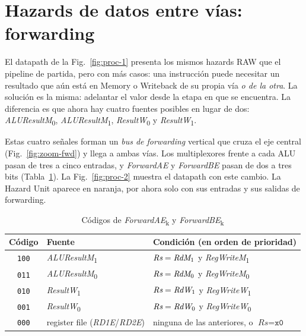 \documentclass[11pt,a4paper]{article}
\newcommand{\sig}[1]{\textit{#1}}
\newcommand{\sigk}[2]{\textit{#1}\textsubscript{#2}}
\begin{document}
\section{Hazards de datos entre vías: forwarding}
\label{sec:forward}

El datapath de la Fig.~\ref{fig:proc-1} presenta los mismos hazards RAW que el pipeline de
partida, pero con más casos: una instrucción puede necesitar un resultado que aún está
en Memory o Writeback de su propia vía \emph{o de la otra}. La solución es la misma:
adelantar el valor desde la etapa en que se encuentra. La diferencia es que ahora hay
cuatro fuentes posibles en lugar de dos: \sigk{ALUResultM}{0}, \sigk{ALUResultM}{1},
\sigk{ResultW}{0} y \sigk{ResultW}{1}.

Estas cuatro señales forman un \emph{bus de forwarding} vertical que cruza el eje central
(Fig.~\ref{fig:zoom-fwd}) y llega a ambas vías. Los multiplexores frente a cada ALU pasan
de tres a cinco entradas, y \sig{ForwardAE} y \sig{ForwardBE} pasan de dos a tres bits
(Tabla~\ref{tab:fwd}). La Fig.~\ref{fig:proc-2} muestra el datapath con este cambio. La
Hazard Unit aparece en naranja, por ahora solo con sus entradas y sus salidas de
forwarding.

\begin{table}[htbp]
\centering\small
\caption{Códigos de \sigk{ForwardAE}{k} y \sigk{ForwardBE}{k}}
\label{tab:fwd}
\begin{tabular}{@{}cll@{}}
\toprule
Código & Fuente & Condición (en orden de prioridad) \\
\midrule
\texttt{100} & \sigk{ALUResultM}{1} & $\sig{Rs} = \sigk{RdM}{1}$ y \sigk{RegWriteM}{1} \\
\texttt{011} & \sigk{ALUResultM}{0} & $\sig{Rs} = \sigk{RdM}{0}$ y \sigk{RegWriteM}{0} \\
\texttt{010} & \sigk{ResultW}{1}    & $\sig{Rs} = \sigk{RdW}{1}$ y \sigk{RegWriteW}{1} \\
\texttt{001} & \sigk{ResultW}{0}    & $\sig{Rs} = \sigk{RdW}{0}$ y \sigk{RegWriteW}{0} \\
\texttt{000} & register file (\sig{RD1E}/\sig{RD2E}) & ninguna de las anteriores, o $\sig{Rs} = \texttt{x0}$ \\
\bottomrule
\end{tabular}
\end{table}
\end{document}
